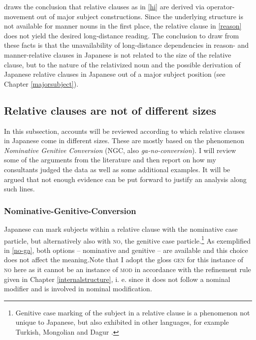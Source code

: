 \documentclass [output=book,colorlinks,citecolor=brown]{langscibook}
\begin{document}
\citet{miyamoto:2017:RC} draws the conclusion that relative clauses as in \ref{hi} are derived via operator-movement out of major subject constructions. Since the underlying structure is not available for manner nouns in the first place, the relative clause in \ref{reason} does not yield the desired long-distance reading. The conclusion to draw from these facts is that the unavailability of long-distance dependencies in reason- and manner-relative clauses in Japanese is not related to the size of the relative clause, but to the nature of the relativized noun and the possible derivation of Japanese relative clauses in Japanese out of a major subject position (see Chapter \ref{majorsubject}).

\subsection{Relative clauses are not of different sizes} \label{NGC}

In this subsection, accounts will be reviewed according to which relative clauses in Japanese come in different sizes. These are mostly based on the phenomenon \textit{Nominative Genitive Conversion} (NGC, also \textit{ga-no-conversion}). I will review some of the arguments from the literature and then report on how my consultants judged the data as well as some additional examples. It will be argued that not enough evidence can be put forward to justify an analysis along such lines.

\subsubsection{Nominative-Genitive-Conversion}

Japanese can mark subjects within a relative clause with the nominative case particle, but alternatively also with \textsc{no}, the genitive case particle.\footnote{Genitive case marking of the subject in a relative clause is a phenomenon not unique to Japanese, but also exhibited in other languages, for example Turkish, Mongolian and Dagur \citep{krause:2001:rrc}.} As exemplified in \ref{no-ga}, both options -- nominative and genitive -- are available and this choice does not affect the meaning.Note that I adopt the gloss \textsc{gen} for this instance of \textsc{no} here as it cannot be an instance of \textsc{mod} in accordance with the refinement rule given in Chapter \ref{internalstructure}, i. e. since it does not follow a nominal modifier and is involved in nominal modification. %
\end{document}

